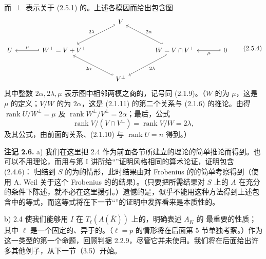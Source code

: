 而 $\perp$ 表示关于 (2.5.1) 的。上述各模因而给出包含图
\[
\begin{tikzcd}[column sep=large,row sep=large]
&&V\arrow[dl,hook',"2\lambda"']&&\\
U&W^\perp=V+V^\perp\arrow[l,hook',"\mu"']&&W=V\cap V^\perp\arrow[ul,hook',"2\alpha"']\arrow[dl,hook',"2\lambda"]&0\arrow[l,hook',"\mu"]\\
&&V^\perp\arrow[ul,hook',"2\alpha"]&&
\end{tikzcd}\tag{2.5.4}
\]
其中整数 $2\alpha,2\lambda,\mu$ 表示图中相邻两模之商的，记号同 (2.1.9)。（$W$ 的为 $\mu$，这是 $\mu$ 的定义；$V/W$ 的为 $2\alpha$，这是 (2.1.11) 的第二个关系与 (2.1.6) 的推论。由得 $\operatorname{rank}U/W^\perp=\mu$ 及 $\operatorname{rank}W^\perp/V^\perp=2\alpha$；最后，公式
\[\operatorname{rank}V/(V\cap V^\perp)=\operatorname{rank}V/W=2\lambda,\tag{2.5.5}\]
及其公式，由前面的关系、(2.1.10) 与 $\operatorname{rank}U=n$ 得到。）

\textbf{注记 2.6.} a) 我们在这里把 2.4 作为前面各节所建立的理论的简单推论而得到。也可以不用理论，而用与第 I 讲所给“”证明风格相同的算术论证，证明包含 (2.4.6)：
归结到 $S$ 的为的情形，此时结果由对 Frobenius 的的简单考察得到（使用 A. Weil 关于这个 Frobenius 的的结果）。（只要把所需结果对 $S$ 上的 $A$ 在充分的条件下陈述，就不必在这里援引。）遗憾的是，似乎不能用这种方法得到上述包含中的等式，而这等式将在下一节“”的证明中发挥看来是本质性的。

b)  2.4 使我们能够用 $I$ 在  $T_\ell(A(\overline K))$ 上的，明确表述 $A_K$ 的 最重要的性质；其中 $\ell$ 是一个固定的、异于的。（$\ell=p$ 的情形将在后面第 5 节单独考察。）作为这一类型的第一个命题，回顾判据 2.2.9，尽管它并未使用。我们将在后面给出许多其他例子，从下一节（3.5）开始。
